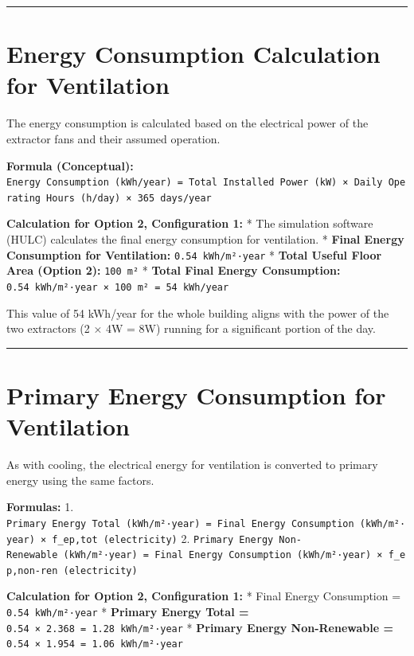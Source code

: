 \documentclass[
  10pt,
  letterpaper,
]{scrbook}
\begin{document}
\begin{center}\rule{0.5\linewidth}{0.5pt}\end{center}

\section{Energy Consumption Calculation for
Ventilation}\label{energy-consumption-calculation-for-ventilation}

The energy consumption is calculated based on the electrical power of
the extractor fans and their assumed operation.

\textbf{Formula (Conceptual):}
\texttt{Energy\ Consumption\ (kWh/year)\ =\ Total\ Installed\ Power\ (kW)\ ×\ Daily\ Operating\ Hours\ (h/day)\ ×\ 365\ days/year}

\textbf{Calculation for Option 2, Configuration 1:} * The simulation
software (HULC) calculates the final energy consumption for ventilation.
* \textbf{Final Energy Consumption for Ventilation:}
\texttt{0.54\ kWh/m²·year} * \textbf{Total Useful Floor Area (Option
2):} \texttt{100\ m²} * \textbf{Total Final Energy Consumption:}
\texttt{0.54\ kWh/m²·year\ ×\ 100\ m²\ =\ 54\ kWh/year}

This value of 54 kWh/year for the whole building aligns with the power
of the two extractors (2 × 4W = 8W) running for a significant portion of
the day.

\begin{center}\rule{0.5\linewidth}{0.5pt}\end{center}

\section{Primary Energy Consumption for
Ventilation}\label{primary-energy-consumption-for-ventilation}

As with cooling, the electrical energy for ventilation is converted to
primary energy using the same factors.

\textbf{Formulas:} 1.
\texttt{Primary\ Energy\ Total\ (kWh/m²·year)\ =\ Final\ Energy\ Consumption\ (kWh/m²·year)\ ×\ f\_ep,tot\ (electricity)}
2.
\texttt{Primary\ Energy\ Non-Renewable\ (kWh/m²·year)\ =\ Final\ Energy\ Consumption\ (kWh/m²·year)\ ×\ f\_ep,non-ren\ (electricity)}

\textbf{Calculation for Option 2, Configuration 1:} * Final Energy
Consumption = \texttt{0.54\ kWh/m²·year} * \textbf{Primary Energy Total
=} \texttt{0.54\ ×\ 2.368\ =\ 1.28\ kWh/m²·year} * \textbf{Primary
Energy Non-Renewable =} \texttt{0.54\ ×\ 1.954\ =\ 1.06\ kWh/m²·year}
\end{document}
